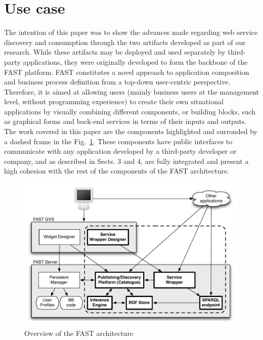 
\section{Use case}
\label{sec:use_case}

The intention of this paper was to show the advances made regarding web service discovery and consumption through the two artifacts developed as part of our research. While these artifacts may be deployed and used separately by third-party applications, they were originally developed to form the backbone of the FAST platform.
FAST constitutes a novel approach to application composition and business process definition from a top-down user-centric perspective. Therefore, it is aimed at allowing users (mainly business users at the management level, without programming experience) to create their own situational applications by visually combining different components, or building blocks, such as graphical forms and back-end services in terms of their inputs and outputs. The work covered in this paper are the components highlighted and surronded by a dashed frame in the Fig.~\ref{fig:fast_architecture}. These components have public interfaces to communicate with any application developed by a third-party developer or company, and as described in Sects. 3 and 4, are fully integrated and present a high cohesion with the rest of the components of the FAST architecture. 

\begin{figure}[ht]
  \begin{center}
    \includegraphics[width=.9\linewidth]{images/fast_architecture.pdf}
    \caption{Overview of the FAST architecture}
    \label{fig:fast_architecture}
  \end{center}
\end{figure}

